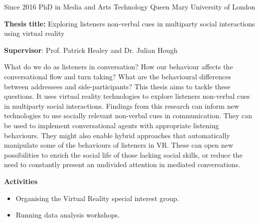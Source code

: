 \documentclass[]{friggeri-cv}
\begin{document}
\begin{entrylist}

    \entry
    {Since 2016}
    {PhD in Media and Arts Technology}
    {Queen Mary University of London}
    {
      \textbf{Thesis title:} Exploring listeners non-verbal cues in multiparty social interactions using virtual reality

      \textbf{Supervisor}: Prof. Patrick Healey and Dr. Julian Hough

      What do we do as listeners in conversation?
      How our behaviour affects the conversational flow and turn taking?
      What are the behavioural differences between addressees and side-participants?
      This thesis aims to tackle these questions.
      It uses virtual reality technologies to explore listeners non-verbal cues in multiparty social interactions.
      Findings from this research can inform new technologies to use socially relevant non-verbal cues in communication.
      They can be used to implement conversational agents with appropriate listening behaviours.
      They might also enable hybrid approaches that automatically manipulate some of the behaviours of listeners in VR.
      These can open new possibilities to enrich the social life of those lacking social skills, or reduce the need to constantly present an undivided attention in mediated conversations.

      \textbf{Activities}
      \begin{itemize}
        \item
          Organising the Virtual Reality special interest group.
        \item
          Running data analysis workshops.
      \end{itemize}
    }

\end{entrylist}
\end{document}
